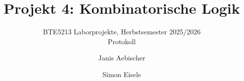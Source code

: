 \documentclass[
  a4paper,
  invert-title,
  titleimage-ratio=13
]{bfhpub}
\begin{document}

\frontmatter %

  \title{Projekt 4: Kombinatorische Logik}
  \subtitle{BTE5213 Laborprojekte, Herbstsemester 2025/2026\\Protokoll}
  \author{Janis Aebischer \and Simon Eisele}
  \maketitle

\end{document}

